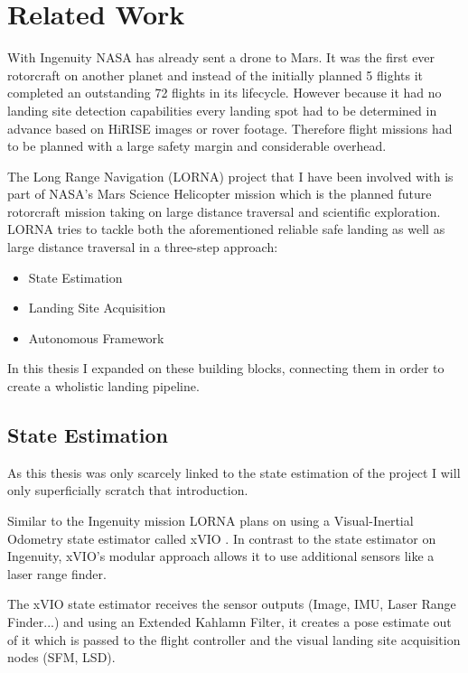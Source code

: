 \chapter{Related Work}
\label{sec:relwork}

With Ingenuity\citep{Ingenuity} NASA has already sent a drone to Mars. It was the first ever rotorcraft on another planet and instead of the initially planned 5 flights it completed an outstanding 72 flights in its lifecycle. However because it had no landing site detection capabilities every landing spot had to be determined in advance based on HiRISE images or rover footage. Therefore flight missions had to be planned with a large safety margin and considerable overhead. 

The Long Range Navigation (LORNA) project that I have been involved with is part of NASA's Mars Science Helicopter mission which is the planned future rotorcraft mission taking on large distance traversal and scientific exploration. LORNA tries to tackle both the aforementioned reliable safe landing as well as large distance traversal in a three-step approach:

\begin{itemize}
    \item State Estimation \citep{XVIO, XMBL}
    \item Landing Site Acquisition \citep{LSDnSFM}
    \item Autonomous Framework \citep{Autonomy}
\end{itemize}

In this thesis I expanded on these building blocks, connecting them in order to create a wholistic landing pipeline.

\section{State Estimation}\label{sec:state_estimator}

As this thesis was only scarcely linked to the state estimation of the project I will only superficially scratch that introduction. 

Similar to the Ingenuity mission LORNA plans on using a Visual-Inertial Odometry state estimator called xVIO \citep{XVIO}. In contrast to the state estimator on Ingenuity, xVIO's modular approach allows it to use additional sensors like a laser range finder.

The xVIO state estimator receives the sensor outputs (Image, IMU, Laser Range
Finder...) and using an Extended Kahlamn Filter, it creates a pose estimate out of it which is passed to the flight controller and the visual landing site acquisition nodes (SFM, LSD).

